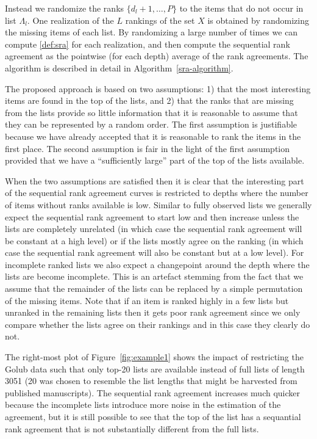\documentclass[oupdraft]{bio}
\newcommand{\added}[1]{{\color{added}{}#1}}
\begin{document}
Instead we randomize the ranks $\{d_{l}+1,\dots,P\}$ to the items that
do not occur in list $\Lambda_l$. One realization of the $L$ rankings
of the set $X$ is obtained by randomizing the missing items of each
list. By randomizing a large number of times we can compute
\eqref{def:sra} for each realization, and then compute the sequential
rank agreement as the pointwise (for each depth) average of the rank
agreements. The algorithm is described in detail in
Algorithm~\ref{sra-algorithm}.


The proposed approach is based on two assumptions: 1) that the most
interesting items are found in the top of the lists, and 2) that the
ranks that are missing from the lists provide so little information
that it is reasonable to assume that they can be represented by a
random order. The first assumption is justifiable because we have
already accepted that it is reasonable to rank the items in the first
place. The second assumption is fair in the light of the first
assumption provided that we have a ``sufficiently large'' part of the
top of the lists available.

When the two assumptions are satisfied then it is clear that the
interesting part of the sequential rank agreement curves is restricted
to depths where the number of items without ranks available is
low.
Similar to fully observed lists we generally expect the sequential
rank agreement to start low and then increase unless the lists are
completely unrelated (in which case the sequential rank agreement will
be constant at a high level) or if the lists mostly agree on the
ranking (in which case the sequential rank agreement will also be
constant but at a low level). For incomplete ranked lists we also
expect a changepoint around the depth where the lists are become
incomplete. This is an artefact stemming from the fact that we assume
that the remainder of the lists can be replaced by a simple
permutation of the missing items. \added{Note that if an item is
  ranked highly in a few lists but unranked in the remaining lists
  then it gets poor rank agreement since we only compare
  whether the lists agree on their rankings and in this case they
  clearly do not.}

The right-most plot of Figure~\ref{fig:example1} shows the impact
of restricting the Golub data such that only top-20 lists are
available instead of full lists of length 3051 (20 was chosen to
resemble the list lengths that might be harvested from published manuscripts). The sequential rank agreement increases much quicker
because the incomplete lists introduce more noise in the estimation of
the agreement, but it is still possible to see that the top of the
list has a sequantial rank agreement that is not substantially
different from the full lists.
\end{document}
